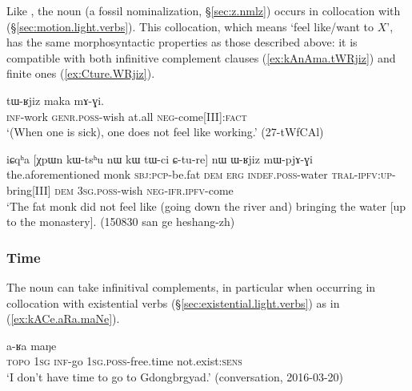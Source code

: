 Like , the noun  (a fossil  nominalization, §\ref{sec:z.nmlz}) occurs in collocation with  (§\ref{sec:motion.light.verbs}). This collocation, which means `feel like/want to $X$', has the same morphosyntactic properties as those described above: it is compatible with both infinitive complement clauses (\ref{ex:kAnAma.tWRjiz}) and finite ones (\ref{ex:Cture.WRjiz}).

\begin{exe}
\ex  \label{ex:kAnAma.tWRjiz}
\gll [kɤ-nɤma] tɯ-ʁjiz maka mɤ-ɣi. \\
\textsc{inf}-work \textsc{genr}.\textsc{poss}-wish at.all \textsc{neg}-come[III]:\textsc{fact} \\
\glt `(When one is sick), one does not feel like working.' (27-tWfCAl)
\end{exe}

\begin{exe}
\ex  \label{ex:Cture.WRjiz}
\gll  iɕqʰa [χpɯn kɯ-tsʰu nɯ kɯ tɯ-ci ɕ-tu-re] nɯ ɯ-ʁjiz mɯ-pjɤ-ɣi  \\
the.aforementioned monk \textsc{sbj}:\textsc{pcp}-be.fat \textsc{dem} \textsc{erg} \textsc{indef}.\textsc{poss}-water \textsc{tral}-\textsc{ipfv}:\textsc{up}-bring[III] \textsc{dem} \textsc{3sg}.\textsc{poss}-wish \textsc{neg}-\textsc{ifr}.\textsc{ipfv}-come  \\
\glt `The fat monk did not feel like (going down the river and) bringing the water [up to the monastery]. (150830 san ge heshang-zh)
\end{exe} 
 
 
\subsubsection{Time} \label{sec:free.time.complement}
The noun  can take infinitival complements, in particular when occurring in collocation with existential verbs (§\ref{sec:existential.light.verbs}) as in (\ref{ex:kACe.aRa.maNe}). 
 
\begin{exe}
\ex  \label{ex:kACe.aRa.maNe}
 a-ʁa maŋe \\
\textsc{topo} \textsc{1sg} \textsc{inf}-go \textsc{1sg}.\textsc{poss}-free.time not.exist:\textsc{sens} \\
\glt `I don't have time to go to Gdongbrgyad.' (conversation, 2016-03-20)
\end{exe} 

